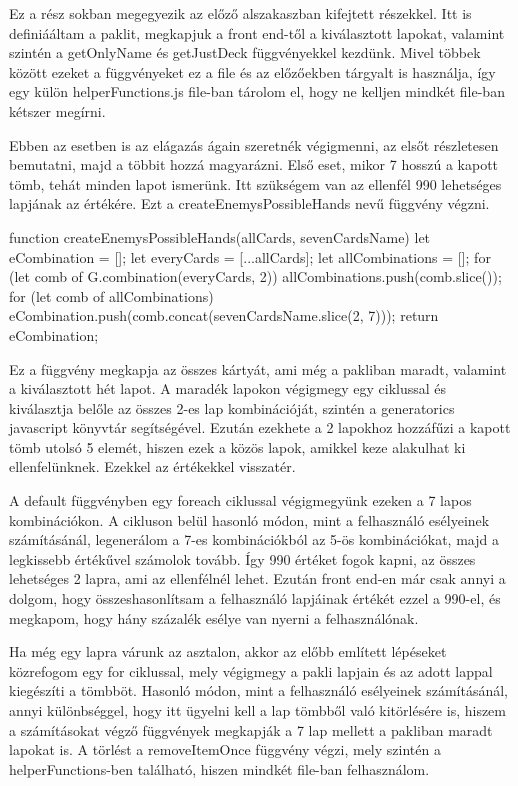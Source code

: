 Ez a rész sokban megegyezik az előző alszakaszban kifejtett részekkel. Itt is definiááltam a paklit, megkapjuk a front end-től a kiválasztott lapokat, valamint szintén a getOnlyName és getJustDeck függvényekkel kezdünk. Mivel többek között ezeket a függvényeket ez a file és az előzőekben tárgyalt is használja, így egy külön helperFunctions.js file-ban tárolom el, hogy ne kelljen mindkét file-ban kétszer megírni.

Ebben az esetben is az elágazás ágain szeretnék végigmenni, az elsőt részletesen bemutatni, majd a többit hozzá magyarázni. Első eset, mikor 7 hosszú a kapott tömb, tehát minden lapot ismerünk. Itt szükségem van az ellenfél 990 lehetséges lapjának az értékére. Ezt a createEnemysPossibleHands nevű függvény végzni.

\begin{python}
function createEnemysPossibleHands(allCards, sevenCardsName) {
  let eCombination = [];
  let everyCards = [...allCards];
  let allCombinations = [];
  for (let comb of G.combination(everyCards, 2)) {
    allCombinations.push(comb.slice());
  }
  for (let comb of allCombinations) {
    eCombination.push(comb.concat(sevenCardsName.slice(2, 7)));
  }
  return eCombination;
}
\end{python}

Ez a függvény megkapja az összes kártyát, ami még a pakliban maradt, valamint a kiválasztott hét lapot. A maradék lapokon végigmegy egy ciklussal és kiválasztja belőle az összes 2-es lap kombinációját, szintén a generatorics javascript könyvtár segítségével. Ezután ezekhete a 2 lapokhoz hozzáfűzi a kapott tömb utolsó 5 elemét, hiszen ezek a közös lapok, amikkel keze alakulhat ki ellenfelünknek. Ezekkel az értékekkel visszatér.

A default függvényben egy foreach ciklussal végigmegyünk ezeken a 7 lapos kombinációkon. A cikluson belül hasonló módon, mint a felhasználó esélyeinek számításánál, legenerálom a 7-es kombinációkból az 5-ös kombinációkat, majd a legkissebb értékűvel számolok tovább. Így 990 értéket fogok kapni, az összes lehetséges 2 lapra, ami az ellenfélnél lehet. Ezután front end-en már csak annyi a dolgom, hogy összeshasonlítsam a felhasználó lapjáinak értékét ezzel a 990-el, és megkapom, hogy hány százalék esélye van nyerni a felhasználónak.

Ha még egy lapra várunk az asztalon, akkor az előbb említett lépéseket közrefogom egy for ciklussal, mely végigmegy a pakli lapjain és az adott lappal kiegészíti a tömbböt. Hasonló módon, mint a felhasználó esélyeinek számításánál, annyi különbséggel, hogy itt ügyelni kell a lap tömbből való kitörlésére is, hiszem a számításokat végző függvények megkapják a 7 lap mellett a pakliban maradt lapokat is. A törlést a removeItemOnce függvény végzi, mely szintén a helperFunctions-ben található, hiszen mindkét file-ban felhasználom.

